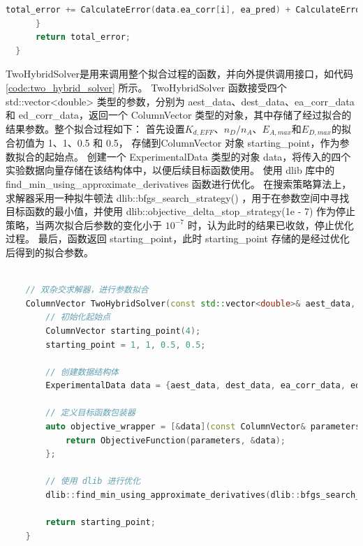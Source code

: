 \begin{enumerate}
\begin{lstlisting}[language=C++, caption={误差计算函数}, label={code:error_calculate}]
          total_error += CalculateError(data.ea_corr[i], ea_pred) + CalculateError(data.ed_corr[i], ed_pred);
      }
      return total_error;
  }
  \end{lstlisting}
  TwoHybridSolver是用来调用整个拟合过程的函数，并向外提供调用接口，如代码 \ref{code:two_hybrid_solver} 所示。
  {TwoHybridSolver} 函数接受四个 std::vector<double> 类型的参数，分别为 {aest\_data}、{dest\_data}、{ea\_corr\_data} 和 {ed\_corr\_data}，返回一个 {ColumnVector} 类型的对象，其中存储了经过拟合的结果参数。整个拟合过程如下：
  首先设置$K_{d,EFF}$、$n_D/n_A$、$E_{A,max}$和$E_{D,max}$的拟合初值为 1、1、0.5 和 0.5， 存储到{ColumnVector} 对象 {starting\_point}，作为参数拟合的起始点。
  创建一个 {ExperimentalData} 类型的对象 {data}，将传入的四个实验数据向量存储在该结构体中，以便后续目标函数使用。
  使用 {dlib} 库中的 {find\_min\_using\_approximate\_derivatives} 函数进行优化。
  在搜索策略算法上，求解器采用一种拟牛顿法 {dlib::bfgs\_search\_strategy()} ，用于在参数空间中寻找目标函数的最小值，并使用 {dlib::objective\_delta\_stop\_strategy(1e - 7)} 作为停止策略，当两次拟合后参数的变化小于 $10^{-7}$ 时，认为此时的结果已收敛，停止优化过程。
  最后，函数返回 {starting\_point}，此时 {starting\_point} 存储的是经过优化后得到的拟合参数。
  \begin{lstlisting}[language=C++, caption={双杂交求解器}, label={code:two_hybrid_solver}]
    
    // 双杂交求解器，进行参数拟合
    ColumnVector TwoHybridSolver(const std::vector<double>& aest_data, const std::vector<double>& dest_data, const std::vector<double>& ea_corr_data,const std::vector<double>& ed_corr_data) {
        // 初始化起始点
        ColumnVector starting_point(4);
        starting_point = 1, 1, 0.5, 0.5;
    
        // 创建数据结构体
        ExperimentalData data = {aest_data, dest_data, ea_corr_data, ed_corr_data};
    
        // 定义目标函数包装器
        auto objective_wrapper = [&data](const ColumnVector& parameters) {
            return ObjectiveFunction(parameters, &data);
        };
    
        // 使用 dlib 进行优化
        dlib::find_min_using_approximate_derivatives(dlib::bfgs_search_strategy(), dlib::objective_delta_stop_strategy(1e-7), objective_wrapper, starting_point, -1, 0.01);
  
        return starting_point;
    }
    \end{lstlisting}  
\end{enumerate}


